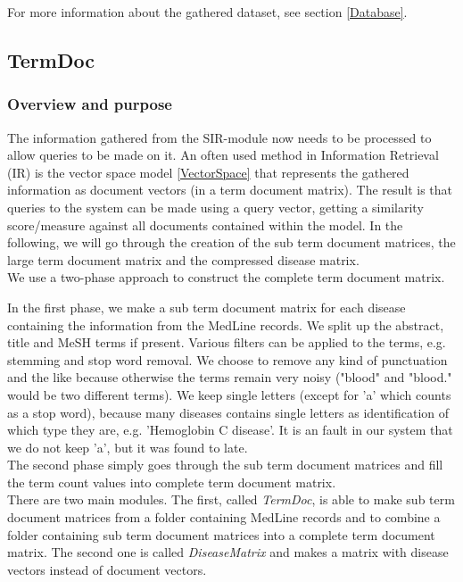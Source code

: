 For more information about the gathered dataset, see section \ref{Database}.

\subsection{TermDoc\label{TermDoc}}

\subsubsection{Overview and purpose}
The information gathered from the SIR-module now needs to be processed
to allow queries to be made on it. An often used method in Information
Retrieval (IR) is the vector space model \ref{VectorSpace} that
represents the gathered information as document vectors (in a term
document matrix). The result is that queries to the system can be made
using a query vector, getting a similarity score/measure against all
documents contained within the model. In the following, we will go
through the creation of the sub term document matrices, the large term
document matrix and the compressed disease matrix.\\

We use a two-phase approach to construct the complete term document
matrix.

In the first phase, we make a sub term document matrix for each
disease containing the information from the MedLine records. We split
up the abstract, title and MeSH terms if present. Various filters can
be applied to the terms, e.g. stemming and stop word removal. We
choose to remove any kind of punctuation and the like because
otherwise the terms remain very noisy ("blood" and "blood." would be
two different terms). We keep single letters (except for 'a' which
counts as a stop word), because many diseases contains single letters
as identification of which type they are, e.g. 'Hemoglobin C
disease'. It is an fault in our system that we do not keep 'a', but it
was found to late. \\

The second phase simply goes through the sub term document matrices
and fill the term count values into complete term document matrix.\\

There are two main modules. The first, called \textit{TermDoc}, is
able to make sub term document matrices from a folder containing
MedLine records and to combine a folder containing sub term document
matrices into a complete term document matrix. The second one is
called \textit{DiseaseMatrix} and makes a matrix with disease vectors
instead of document vectors.

